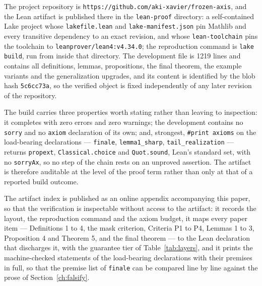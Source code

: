 The project repository is \texttt{https://github.com/\hspace{0pt}aki-xavier/\hspace{0pt}frozen-axis}, and the Lean artifact is published there in the \texttt{lean-proof} directory: a self-contained Lake project whose \texttt{lakefile.lean} and \texttt{lake-manifest.json} pin Mathlib and every transitive dependency to an exact revision, and whose \texttt{lean-toolchain} pins the toolchain to \texttt{leanprover/\hspace{0pt}lean4:v4.34.0}; the reproduction command is \texttt{lake build}, run from inside that directory. The development file is 1219 lines and contains all definitions, lemmas, propositions, the final theorem, the example variants and the generalization upgrades, and its content is identified by the blob hash \texttt{5c6cc73a}, so the verified object is fixed independently of any later revision of the repository.

The build carries three properties worth stating rather than leaving to inspection: it completes with zero errors and zero warnings; the development contains no \texttt{sorry} and no \texttt{axiom} declaration of its own; and, strongest, \texttt{\#print axioms} on the load-bearing declarations --- \texttt{finale}, \texttt{lemma1\_sharp}, \texttt{tail\_realization} --- returns \texttt{propext}, \texttt{Classical.choice} and \texttt{Quot.sound}, Lean's standard set, with no \texttt{sorryAx}, so no step of the chain rests on an unproved assertion. The artifact is therefore auditable at the level of the proof term rather than only at that of a reported build outcome.

The artifact index is published as an online appendix accompanying this paper, so that the verification is inspectable without access to the artifact: it records the layout, the reproduction command and the axiom budget, it maps every paper item --- Definitions 1 to 4, the mask criterion, Criteria P1 to P4, Lemmas 1 to 3, Proposition 4 and Theorem 5, and the final theorem --- to the Lean declaration that discharges it, with the guarantee tier of Table~\ref{tab:layers}, and it prints the machine-checked statements of the load-bearing declarations with their premises in full, so that the premise list of \texttt{finale} can be compared line by line against the prose of Section~\ref{ch:falsify}.
